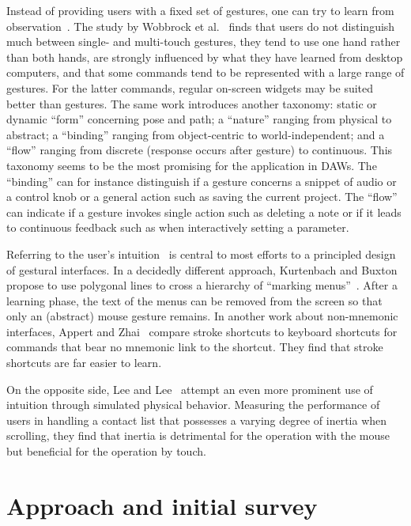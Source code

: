 \documentclass{aes130}
\begin{document}
Instead of providing users with a fixed set of gestures, one can try to learn from observation~\cite{Akers:2007:ODM:1240866.1240868}. The study by Wobbrock et al.~\cite{Wobbrock:2009:UGS:1518701.1518866} finds that users do not distinguish much between single- and multi-touch gestures, they tend to use one hand rather than both hands, are strongly influenced by what they have learned from desktop computers, and that some commands tend to be represented with a large range of gestures. For the latter commands, regular on-screen widgets may be suited better than gestures. The same work introduces another taxonomy: static or dynamic ``form'' concerning pose and path; a ``nature'' ranging from physical to abstract; a ``binding'' ranging from object-centric to world-independent; and a ``flow'' ranging from discrete (response occurs after gesture) to continuous. This taxonomy seems to be the most promising for the application in DAWs. The ``binding'' can for instance distinguish if a gesture concerns a snippet of audio or a control knob or a general action such as saving the current project. The ``flow'' can indicate if a gesture invokes single action such as deleting a note or if it leads to continuous feedback such as when interactively setting a parameter.

Referring to the user's intuition~\cite{Naumann:2007:IUU:1784197.1784212} is central to most efforts to a principled design of gestural interfaces. In a decidedly different approach, Kurtenbach and Buxton propose to use polygonal lines to cross a hierarchy of ``marking menus''~\cite{Kurtenbach:1993:LEP:164632.164977}. After a learning phase, the text of the menus can be removed from the screen so that only an (abstract) mouse gesture remains. In another work about non-mnemonic interfaces, Appert and Zhai~\cite{Appert:2009:USC:1518701.1519052} compare stroke shortcuts to keyboard shortcuts for commands that bear no mnemonic link to the shortcut. They find that stroke shortcuts are far easier to learn.

On the opposite side, Lee and Lee~\cite{Lee:2009:EEP:1520340.1520667} attempt an even more prominent use of intuition through simulated physical behavior. Measuring the performance of users in handling a contact list that possesses a varying degree of inertia when scrolling, they find that inertia is detrimental for the operation with the mouse but beneficial for the operation by touch.

\section{Approach and initial survey}\label{initial}
\end{document}
